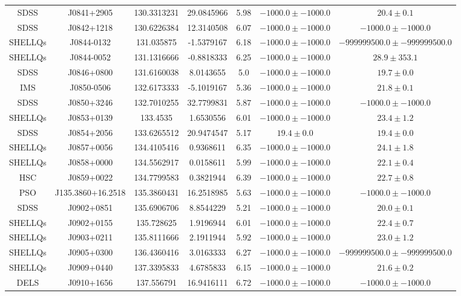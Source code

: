 \begin{table}
\begin{tabular}{ccccccc}
SDSS & J0841+2905 & 130.3313231 & 29.0845966 & 5.98 & $-1000.0\pm-1000.0$ & $  20.4\pm  0.1$ \\
SDSS & J0842+1218 & 130.6226384 & 12.3140508 & 6.07 & $-1000.0\pm-1000.0$ & $-1000.0\pm-1000.0$ \\
SHELLQs & J0844-0132 & 131.035875 & -1.5379167 & 6.18 & $-1000.0\pm-1000.0$ & $-999999500.0\pm-999999500.0$ \\
SHELLQs & J0844-0052 & 131.1316666 & -0.8818333 & 6.25 & $-1000.0\pm-1000.0$ & $  28.9\pm353.1$ \\
SDSS & J0846+0800 & 131.6160038 & 8.0143655 & 5.0 & $-1000.0\pm-1000.0$ & $  19.7\pm  0.0$ \\
IMS & J0850-0506 & 132.6173333 & -5.1019167 & 5.36 & $-1000.0\pm-1000.0$ & $  21.8\pm  0.1$ \\
SDSS & J0850+3246 & 132.7010255 & 32.7799831 & 5.87 & $-1000.0\pm-1000.0$ & $-1000.0\pm-1000.0$ \\
SHELLQs & J0853+0139 & 133.4535 & 1.6530556 & 6.01 & $-1000.0\pm-1000.0$ & $  23.4\pm  1.2$ \\
SDSS & J0854+2056 & 133.6265512 & 20.9474547 & 5.17 & $  19.4\pm  0.0$ & $  19.4\pm  0.0$ \\
SHELLQs & J0857+0056 & 134.4105416 & 0.9368611 & 6.35 & $-1000.0\pm-1000.0$ & $  24.1\pm  1.8$ \\
SHELLQs & J0858+0000 & 134.5562917 & 0.0158611 & 5.99 & $-1000.0\pm-1000.0$ & $  22.1\pm  0.4$ \\
HSC & J0859+0022 & 134.7799583 & 0.3821944 & 6.39 & $-1000.0\pm-1000.0$ & $  22.7\pm  0.8$ \\
PSO & J135.3860+16.2518 & 135.3860431 & 16.2518985 & 5.63 & $-1000.0\pm-1000.0$ & $-1000.0\pm-1000.0$ \\
SDSS & J0902+0851 & 135.6906706 & 8.8544229 & 5.21 & $-1000.0\pm-1000.0$ & $  20.0\pm  0.1$ \\
SHELLQs & J0902+0155 & 135.728625 & 1.9196944 & 6.01 & $-1000.0\pm-1000.0$ & $  22.4\pm  0.7$ \\
SHELLQs & J0903+0211 & 135.8111666 & 2.1911944 & 5.92 & $-1000.0\pm-1000.0$ & $  23.0\pm  1.2$ \\
SHELLQs & J0905+0300 & 136.4360416 & 3.0163333 & 6.27 & $-1000.0\pm-1000.0$ & $-999999500.0\pm-999999500.0$ \\
SHELLQs & J0909+0440 & 137.3395833 & 4.6785833 & 6.15 & $-1000.0\pm-1000.0$ & $  21.6\pm  0.2$ \\
DELS & J0910+1656 & 137.556791 & 16.9416111 & 6.72 & $-1000.0\pm-1000.0$ & $-1000.0\pm-1000.0$ \\

\end{tabular}
\end{table}
